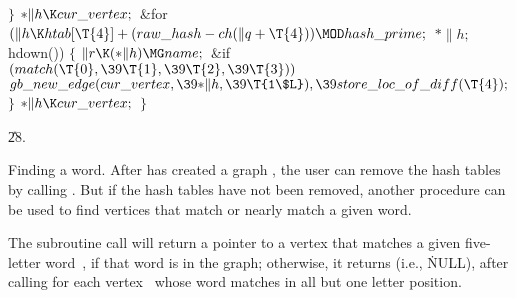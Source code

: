 \4${}\}{}$\2\6
${}{*}\|h\K\\{cur\_vertex};{}$\6
\&{for} ${}(\|h\K\\{htab}[\T{4}]+(\\{raw\_hash}-\\{ch}(\|q+\T{4}))\MOD\\{hash%
\_prime};{}$ ${}{*}\|h;{}$ \\{hdown}())\5
${}\{{}$\1\6
${}\|r\K({*}\|h)\MG\\{name};{}$\6
\&{if} ${}(\\{match}(\T{0},\39\T{1},\39\T{2},\39\T{3})){}$\1\5
${}\\{gb\_new\_edge}(\\{cur\_vertex},\39{*}\|h,\39\T{1\$L}),\39\\{store\_loc%
\_of\_diff}(\T{4});{}$\2\6
\4${}\}{}$\2\6
${}{*}\|h\K\\{cur\_vertex};{}$\6
\4${}\}{}$\2\par
\U28.\fi

Finding a word. After  has created a graph , the
user can
remove the hash tables by calling . But
if the
hash tables have not been removed, another procedure can be used to
find vertices that match or nearly match a given word.

The subroutine call  will return a pointer to a
vertex
that matches a given five-letter word~, if that word is in the graph;
otherwise, it returns \PB{$\NULL$} (i.e., \.{NULL}), after calling  for
each vertex~ whose word matches  in all but one letter
position.

